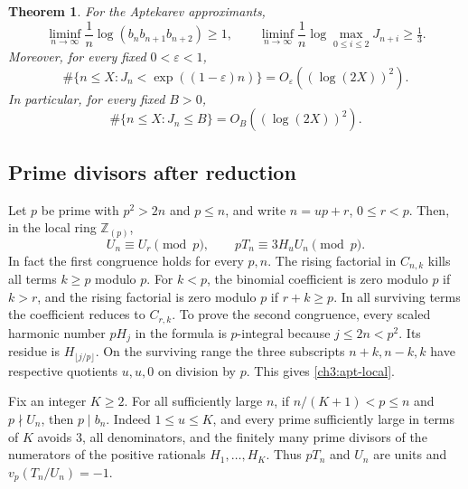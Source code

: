\documentclass[11pt,a4paper,oneside,openany]{report}
\newtheorem{theorem}{Theorem}[section]
\theoremstyle{remark}\newtheorem{remark}[theorem]{Remark}
\numberwithin{equation}{section}
\begin{document}
\begin{theorem}\label{ch3:apt-main}
For the Aptekarev approximants,
\[
 \liminf_{n\to\infty}\frac1n\log(b_n b_{n+1} b_{n+2})\ge1,
 \qquad
 \liminf_{n\to\infty}\frac1n
     \log\max_{0\le i\le2}J_{n+i}\ge\tfrac13.
\]
Moreover, for every fixed $0<\varepsilon<1$,
\[
 \#\{n\le X:J_n<\exp((1-\varepsilon)n)\}
                    =O_{\varepsilon}((\log(2X))^2).
\]
In particular, for every fixed $B>0$,
\[
 \#\{n\le X:J_n\le B\}=O_B((\log(2X))^2).
\]
\end{theorem}

\subsection{Prime divisors after reduction}

Let $p$ be prime with $p^2>2n$ and $p\le n$, and write $n=up+r$,
$0\le r<p$. Then, in the local ring $\mathbb Z_{(p)}$,
\begin{equation}\label{ch3:apt-local}
 U_n\equiv U_r\pmod p,\qquad pT_n\equiv3H_u U_n\pmod p .
\end{equation}
In fact the first congruence holds for every $p,n$. The rising factorial
in $C_{n,k}$ kills all terms $k\ge p$ modulo $p$. For $k<p$, the
binomial coefficient is zero modulo $p$ if $k>r$, and the rising
factorial is zero modulo $p$ if $r+k\ge p$. In all surviving terms the
coefficient reduces to $C_{r,k}$. To prove the second congruence, every
scaled harmonic number $pH_j$ in the formula is $p$-integral because
$j\le2n<p^2$. Its residue is $H_{\lfloor j/p\rfloor}$. On the
surviving range the three subscripts $n+k,n-k,k$ have respective
quotients $u,u,0$ on division by $p$. This gives \eqref{ch3:apt-local}.

Fix an integer $K\ge2$. For all sufficiently large $n$, if
$n/(K+1)<p\le n$ and $p\nmid U_n$, then $p\mid b_n$. Indeed
$1\le u\le K$, and every prime sufficiently large in terms of $K$
avoids $3$, all denominators, and the finitely many prime divisors of
the numerators of the positive rationals $H_1,\ldots,H_K$. Thus
$pT_n$ and $U_n$ are units and $v_p(T_n/U_n)=-1$.
\end{document}
